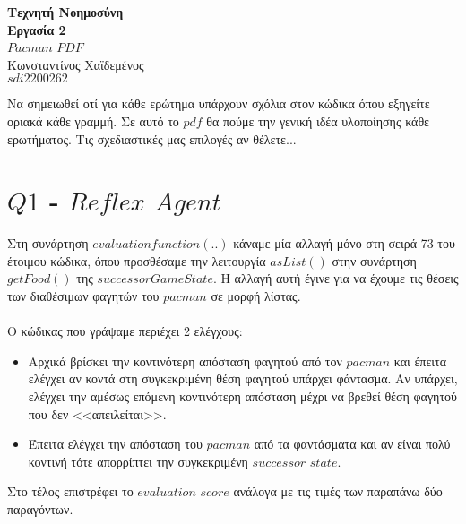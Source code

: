 \documentclass[12pt]{article}
\begin{document}
	\begin{center}
    	\huge \textbf{Τεχνητή Νοημοσύνη \\ Εργασία 2} \\ $Pacman$ $PDF$\\
    	\Large Κωνσταντίνος Χαϊδεμένος\\
    	\large $sdi2200262$\\ 
	\end{center}
\vspace{36pt}

Να σημειωθεί οτί για κάθε ερώτημα υπάρχουν σχόλια στον κώδικα όπου εξηγείτε οριακά κάθε γραμμή. Σε αυτό το $pdf$ θα πούμε την γενική ιδέα υλοποίησης κάθε ερωτήματος. Τις σχεδιαστικές μας επιλογές αν θέλετε...
\section*{$Q1$ - $Reflex$ $Agent$}
Στη συνάρτηση $evaluationfunction(..)$ κάναμε μία αλλαγή μόνο στη σειρά 73 του έτοιμου κώδικα, όπου προσθέσαμε την λειτουργία $asList()$ στην συνάρτηση $getFood()$ της $successorGameState$. Η αλλαγή αυτή έγινε για να έχουμε τις θέσεις των διαθέσιμων φαγητών του $pacman$ σε μορφή λίστας.\\\\
Ο κώδικας που γράψαμε περιέχει 2 ελέγχους:
\begin{itemize}
    \item Αρχικά βρίσκει την κοντινότερη απόσταση φαγητού από τον $pacman$ και έπειτα ελέγχει αν κοντά στη συγκεκριμένη θέση φαγητού υπάρχει φάντασμα. Αν υπάρχει, ελέγχει την αμέσως επόμενη κοντινότερη απόσταση μέχρι να βρεθεί θέση φαγητού που δεν <<απειλείται>>.
    \item Έπειτα ελέγχει την απόσταση του $pacman$ από τα φαντάσματα και αν είναι πολύ κοντινή τότε απορρίπτει την συγκεκριμένη $successor$ $state$.
\end{itemize}
Στο τέλος επιστρέφει το $evaluation$ $score$ ανάλογα με τις τιμές των παραπάνω δύο παραγόντων.
\end{document}
